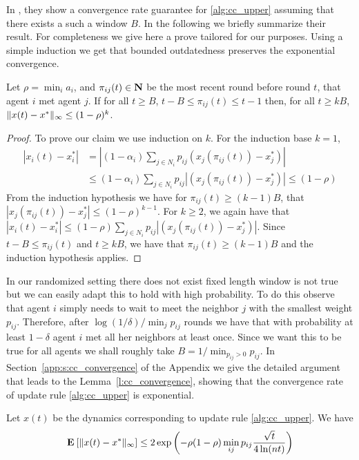 In \cite{BT97}, they show a convergence rate guarantee for
\ref{alg:cc_upper} assuming that there exists a such a window $B$.
In the  following we briefly summarize their result.  For completeness we
give here a prove tailored for our purposes.
Using a simple induction we get that bounded outdatedness
preserves the exponential convergence.
\begin{lemma}\label{l:outdatedness_induction}
  Let $\rho = \min_i a_i$, and $\pi_{ij}(t) \in \bm{\mathrm{N}}$ be the most recent round
  before round $t$, that agent $i$ met agent $j$.
  If for all $t\geq B$, $t-B \leq \pi_{ij}(t) \leq t-1$ then, for
  all $t \geq k B$,
  \(\| x(t) - x^* \|_{\infty} \leq (1-\rho)^k\).
\end{lemma}
\begin{proof}
  To prove our claim we use induction on $k$. For the induction base $k=1$,
  \begin{align*}
    |x_i(t) - x_i^*|
    &=
    |(1-\alpha_i)\sum_{j \in N_i}p_{ij}(x_j(\pi_{ij}(t)) -x_j^*)|\\
    &\leq
    (1-\alpha_i)\sum_{j \in N_i}p_{ij}|(x_j(\pi_{ij}(t))-x_j^*)|\leq (1-\rho)
  \end{align*}
  From the induction hypothesis we have for $\pi_{ij}(t) \geq (k-1)B$,
  that $|x_j(\pi_{ij}(t))-x_j^*| \leq (1-\rho)^{k-1}$.
  For $k\geq 2$, we again have that
  $|x_i(t) - x_i^*|\leq (1-\rho)\sum_{j \in N_i}p_{ij}|(x_j(\pi_{ij}(t))-x_j^*)|$.
  Since $t-B \leq \pi_{ij}(t)$ and $t\geq kB$, we have
  that $\pi_{ij}(t) \geq (k-1)B$ and the induction hypothesis applies.
\end{proof}

In our randomized setting there does not exist fixed length window is
not true but we can easily adapt this to hold with high probability.
To do this observe that agent $i$ simply needs to wait to meet the neighbor
$j$ with the smallest weight $p_{ij}$. Therefore, after
$\log(1/\delta)/\min_{j} p_{ij}$ rounds we have that with probability at least
$1-\delta$ agent $i$ met all her neighbors at least once.
Since we want this to be true for all agents
we shall roughly take $B = 1/\min_{p_{ij} > 0} {p_{ij}}$.
In Section~\ref{app:s:cc_convergence} of the Appendix we give the detailed
argument that leads to the Lemma~\ref{l:cc_convergence},
showing that the convergence rate of update rule \ref{alg:cc_upper} is exponential.

\begin{lemma}\label{l:cc_convergence}
  Let $x(t)$ be the dynamics corresponding
  to update rule \ref{alg:cc_upper}.
  We have
  \[
    \Exp{\norm{\infty}{x(t) - x^*}}
    \leq
    2\exp \lp(- \rho (1-\rho) \min_{ij} p_{ij} \frac{\sqrt{t}}{4\ln(nt)} \rp)
  \]
\end{lemma}
